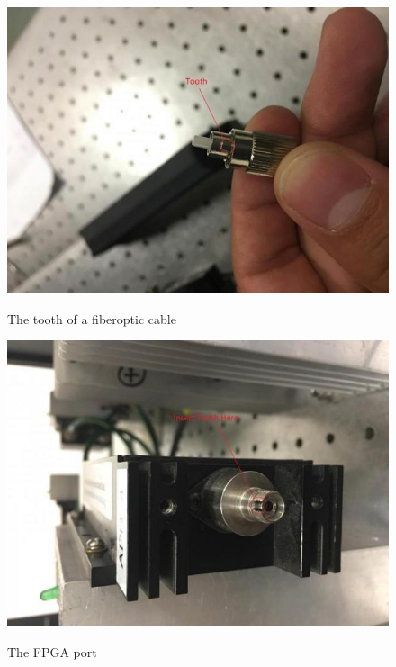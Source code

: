 \documentclass{../lab}
\begin{document}
\noindent

\begin{figure}[H]
\captionsetup{justification=centering}
  \href{http://experimentationlab.berkeley.edu/sites/default/files/QIE/fiberopticcable_0_0_1.JPG}{\includegraphics[width=\linewidth,keepaspectratio]{images/fiberopticcable_0_0_1.JPG}}
  \caption{The tooth of a fiberoptic cable}
  \label{fig:fiberopticcable_0_0_1.JPG}
\endminipage\hfill
{}
  \href{http://experimentationlab.berkeley.edu/sites/default/files/QIE/fpgaport_0_1.JPG}{\includegraphics[width=\linewidth,keepaspectratio]{images/fpgaport_0_1.JPG}}
  \caption{The FPGA port}
  \label{fig:fpgaport_0_1.JPG}
\endminipage\hfill
{}

\end{figure}
\end{document}
